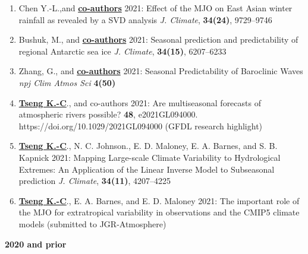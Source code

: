 \documentclass{article}
\begin{document}
\begin{enumerate}[resume]   
	\item Chen Y.-L.,and \normalsize{\bf{\underline{co-authors}}} 2021: Effect of the MJO on East Asian winter rainfall as revealed by a SVD analysis \textit{J. Climate}, \normalsize{\bf{34(24)}}, 9729--9746 \par
	\item Bushuk, M., and \normalsize{\bf{\underline{co-authors}}} 2021: Seasonal prediction and predictability of regional Antarctic sea ice \textit{J. Climate}, \normalsize{\bf{34(15)}}, 6207--6233 \par
	\item Zhang, G., and \normalsize{\bf{\underline{co-authors}}} 2021: Seasonal Predictability of Baroclinic Waves \textit{npj Clim Atmos Sci} \normalsize{\bf{4(50)}}  \par
    \item \normalsize{\bf{\underline{Tseng K.-C}}}., and co-authors 2021: Are multiseasonal forecasts of atmospheric rivers possible? \normalsize{\bf{48}}, e2021GL094000. https://doi.org/10.1029/2021GL094000 (GFDL research highlight)\par
	\item \normalsize{\bf{\underline{Tseng K.-C}}}., N. C. Johnson., E. D. Maloney, E. A. Barnes, and S. B. Kapnick 2021: Mapping Large-scale Climate Variability to Hydrological Extremes: An Application of the Linear Inverse Model to Subseasonal prediction \textit{J. Climate}, \normalsize{\bf{34(11)}}, 4207--4225 \par
	\item \normalsize{\bf{\underline{Tseng K.-C}}}., E. A. Barnes, and E. D. Maloney 2021: The important role of the MJO for extratropical variability in observations and the CMIP5 climate models (submitted to JGR-Atmosphere)  \par 
	 \end{enumerate}
\normalsize{\bf{2020} and prior} 
\end{document}
